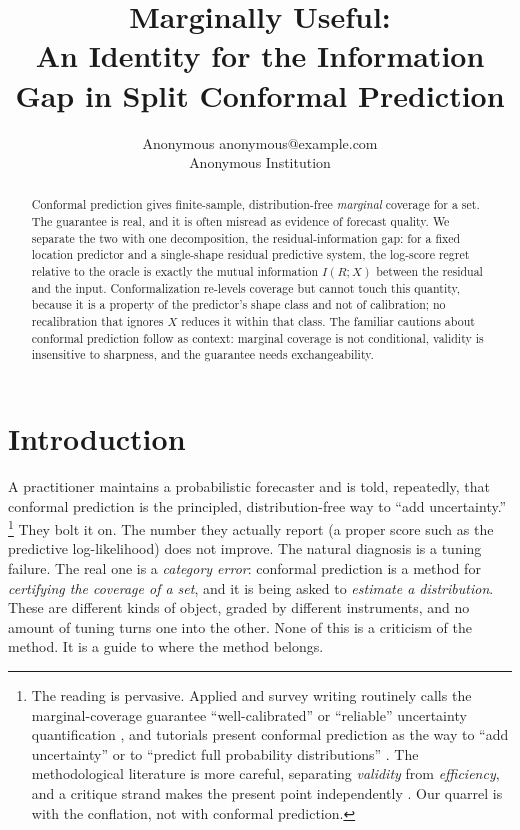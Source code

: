 \documentclass[10pt]{article} %
\title{Marginally Useful:\\ An Identity for the Information Gap in Split Conformal Prediction}
\author{\name Anonymous \email anonymous@example.com \\
        \addr Anonymous Institution}
\theoremstyle{definition}
\begin{document}
\maketitle

\begin{abstract}
Conformal prediction gives finite-sample, distribution-free \emph{marginal} coverage for a
set. The guarantee is real, and it is often misread as evidence of forecast quality. We
separate the two with one decomposition, the residual-information gap: for a fixed location
predictor and a single-shape residual predictive system, the log-score regret relative to the
oracle is exactly the mutual information $I(R;X)$ between the residual and the input.
Conformalization re-levels coverage but cannot touch this quantity, because it is a property
of the predictor's shape class and not of calibration; no recalibration that ignores $X$
reduces it within that class. The familiar cautions about conformal prediction follow as context: marginal coverage is
not conditional, validity is insensitive to sharpness, and the guarantee needs
exchangeability.
\end{abstract}

\section{Introduction}

A practitioner maintains a probabilistic forecaster and is told, repeatedly, that
conformal prediction is the principled, distribution-free way to ``add uncertainty.''%
\footnote{The reading is pervasive. Applied and survey writing routinely calls the
marginal-coverage guarantee ``well-calibrated'' or ``reliable'' uncertainty quantification
\citep{bellotti2025trustworthy}, and tutorials present conformal prediction as the way to
``add uncertainty'' \citep{tds_adduncertainty} or to ``predict full probability
distributions'' \citep{manokhin_fulldist}. The methodological literature is more careful,
separating \emph{validity} from \emph{efficiency}, and a critique strand makes the present
point independently \citep{pitfalls2025medical,min2026coveragelength}. Our quarrel is with
the conflation, not with conformal prediction.}
They bolt it on. The number they actually report (a proper score such as the
predictive log-likelihood) does not improve. The natural diagnosis is a tuning
failure. The real one is a \emph{category error}: conformal
prediction is a method for \emph{certifying the coverage of a set}, and it is being
asked to \emph{estimate a distribution}. These are different kinds of object, graded
by different instruments, and no amount of tuning turns one into the other. None of
this is a criticism of the method. It is a guide to where the method belongs.
\end{document}

